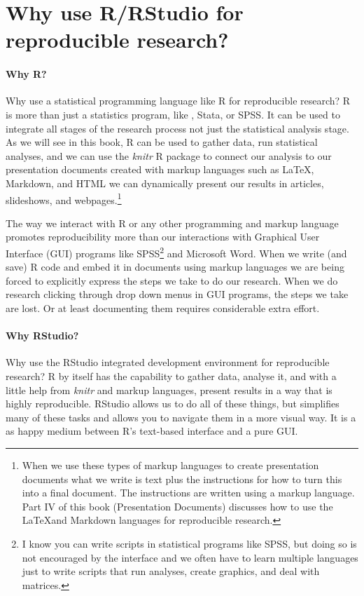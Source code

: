 \documentclass[ChapterTOCs,krantz1]{krantz}\usepackage{graphicx, color}
\begin{document}
\section{Why use R/RStudio for reproducible research?}

\paragraph{Why R?}
Why use a statistical programming language like R for reproducible research? R is more than just a statistics program, like , Stata, or SPSS. It can be used to integrate all stages of the research process not just the statistical analysis stage. As we will see in this book, R can be used to gather data, run statistical analyses, and we can use the {\emph{knitr}} R package to connect our analysis to our presentation documents created with markup languages such as \LaTeX, Markdown, and HTML we can dynamically present our results in articles, slideshows, and webpages.\footnote{When we use these types of markup languages to create presentation documents what we write is text plus the instructions for how to turn this into a final document. The instructions are written using a markup language. Part IV of this book (Presentation Documents) discusses how to use the \LaTeX and Markdown languages for reproducible research.} 

The way we interact with R or any other programming and markup language promotes reproducibility more than our interactions with Graphical User Interface (GUI) programs like SPSS\footnote{I know you can write scripts in statistical programs like SPSS, but doing so is not encouraged by the interface and we often have to learn multiple languages just to write scripts that run analyses, create graphics, and deal with matrices.} and Microsoft Word. When we write (and save) R code and embed it in documents using markup languages we are being forced to explicitly express the steps we take to do our research. When we do research clicking through drop down menus in GUI programs, the steps we take are lost. Or at least documenting them requires considerable extra effort.

\paragraph{Why RStudio?}
Why use the RStudio integrated development environment for reproducible research? R by itself has the capability to gather data, analyse it, and with a little help from {\emph{knitr}} and markup languages, present results in a way that is highly reproducible. RStudio allows us to do all of these things, but simplifies many of these tasks and allows you to navigate them in a more visual way. It is a as happy medium between R's text-based interface and a pure GUI. 
\end{document}
